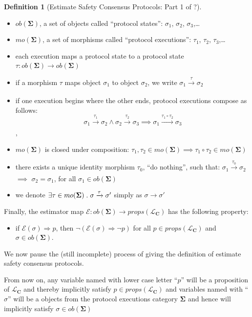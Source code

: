 \documentclass{article}
\theoremstyle{definition}
\newtheorem{defn}{Definition}[section]
\newcommand{\cat}{
	\mathbf
}
\begin{document}
\begin{defn}[Estimate Safety Consensus Protocols: Part 1 of ?]
\begin{description}
\begin{itemize}
\item $ob(\cat{\Sigma})$, a set of objects called ``protocol states'': $\sigma_1$, $\sigma_2$, $\sigma_3$,\ldots
\item $mo(\cat{\Sigma})$, a set of morphisms called ``protocol executions'': $\tau_1$, $\tau_2$, $\tau_3$,\ldots
\item each execution maps a protocol state to a protocol state $\tau:ob(\cat{\Sigma}) \to ob(\cat{\Sigma})$
\item if a morphism $\tau$ maps object $\sigma_1$ to object $\sigma_2$, we write $\sigma_1 \xrightarrow[]{\tau} \sigma_2$
\item if one execution begins where the other ends, protocol executions compose as follows:
$$\sigma_1 \xrightarrow[]{\tau_1} \sigma_2 \land \sigma_2 \xrightarrow[]{\tau_2} \sigma_3 \implies \sigma_1 \xrightarrow[]{\tau_1 \circ \tau_2} \sigma_3$$,
\item $mo(\cat{\Sigma})$ is closed under composition: $\tau_1, \tau_2 \in mo(\cat{\Sigma}) \implies \tau_1 \circ \tau_2 \in mo(\cat{\Sigma})$
\item there exists a unique identity morphism $\tau_0$, ``do nothing'', such that: $\sigma_1 \xrightarrow[]{\tau_0} \sigma_2$ $\implies$ $\sigma_2 = \sigma_1$, for all $\sigma_1 \in ob(\cat{\Sigma})$
\item we denote $\exists \tau \in mo(\cat{\Sigma}) \hspace{1mm} . \hspace{1mm} \sigma \xrightarrow[]{\tau} \sigma'$ simply as $\sigma \to \sigma'$
\end{itemize}


Finally, the estimator map $\mathcal{E}: ob(\cat{\Sigma}) \to props(\mathcal{L}_\cat{C})$ has the following property:
\begin{itemize}
\item if $\mathcal{E}(\sigma) \Rightarrow p$, then $\neg{(\mathcal{E}(\sigma) \Rightarrow \neg p)}$ for all $p \in props(\mathcal{L}_\cat{C})$ and $\sigma \in ob(\cat{\Sigma})$.
\end{itemize}

We now pause the (still incomplete) process of giving the definition of estimate safety consensus protocols.
\end{description}
\end{defn}


From now on, any variable named with lower case letter ``$p$'' will be a proposition of $\mathcal{L}_\cat{C}$ and thereby implicitly satisfy $p \in props(\mathcal{L}_\cat{C})$ and variables named with ``$\sigma$'' will be a objects from the protocol executions category $\cat{\Sigma}$ and hence will implicitly satisfy $\sigma \in ob(\cat{\Sigma})$
\end{document}
